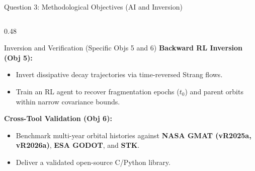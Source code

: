\documentclass[aspectratio=169,10pt]{beamer}
\begin{document}
\begin{frame}{Question 3: Methodological Objectives (AI and Inversion)}
\begin{columns}[t]
        \begin{column}{0.48\textwidth}
            \begin{exampleblock}{Inversion and Verification (Specific Objs 5 and 6)}
                \small
                \textbf{Backward RL Inversion (Obj 5):}
                \begin{itemize}
                    \setlength{\itemsep}{2pt}
                    \item Invert dissipative decay trajectories via time-reversed Strang flows.
                    \item Train an RL agent to recover fragmentation epochs ($t_0$) and parent orbits within narrow covariance bounds.
                \end{itemize}
                \vspace{0.12cm}
                \textbf{Cross-Tool Validation (Obj 6):}
                \begin{itemize}
                    \setlength{\itemsep}{2pt}
                    \item Benchmark multi-year orbital histories against \textbf{NASA GMAT (vR2025a, vR2026a)}, \textbf{ESA GODOT}, and \textbf{STK}.
                    \item Deliver a validated open-source C/Python library.
                \end{itemize}
            \end{exampleblock}
        \end{column}
    \end{columns}
\end{frame}
\end{document}
